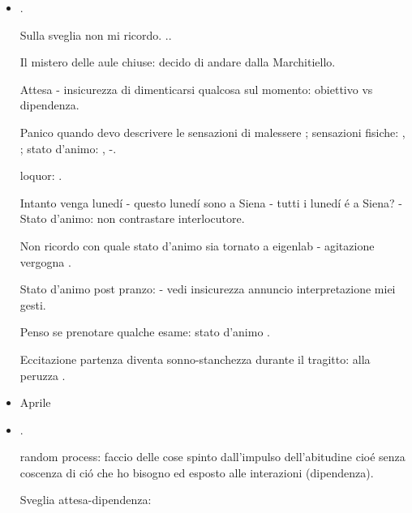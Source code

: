 \begin{itemize}
Mi compiaccio della sicurezza con la fruttivendola e il dipendente coop.

Workout con disperados: stato d'animo - .

Angoscia telefonata - interazione babbo - vincere facile - gratificazione (vedi auto compiacimento)

Doccia - Finale torno calcetto - doccia fredda.

Birra - pizza - mangiare: stato d'animo frastornato, confuso, dipendente, impreparato.

\item {}.

Sulla sveglia non mi ricordo. ..

Il mistero delle aule chiuse: decido di andare dalla Marchitiello.

Attesa -  insicurezza di dimenticarsi qualcosa sul momento: obiettivo vs dipendenza.

Panico quando devo descrivere le sensazioni di malessere ; sensazioni fisiche: , ; stato d'animo: , -.

loquor: .

Intanto venga luned\'i - questo luned\'i sono a Siena - tutti i luned\'i \'e a Siena? - Stato d'animo: non contrastare interlocutore.

Non ricordo con quale stato d'animo sia tornato a eigenlab - agitazione vergogna .

Stato d'animo post pranzo:  - vedi insicurezza annuncio interpretazione miei gesti.

Penso se prenotare qualche esame: stato d'animo .

Eccitazione partenza diventa sonno-stanchezza durante il tragitto: alla peruzza .

\item Aprile

\item {}.

random process: faccio delle cose spinto dall'impulso dell'abitudine cio\'e senza coscenza di ci\'o che ho bisogno ed esposto alle interazioni (dipendenza).

Sveglia attesa-dipendenza: 


\end{itemize}
